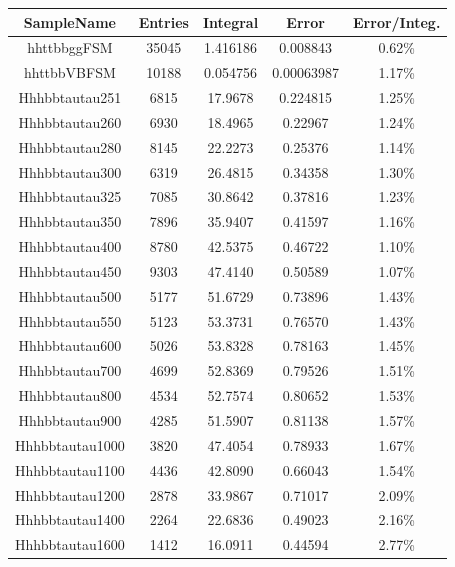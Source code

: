 \begin{table}
    \centering
    \scriptsize
    \begin{tabular}{|c|c|c|c|c|}
	
	\hline
	\hline
	SampleName & Entries & Integral & Error & Error/Integ.\\
	
	\hline
	\hline
	hhttbbggFSM    &35045	 &1.416186  &	0.008843 & 0.62\%\\	
	hhttbbVBFSM	   &10188  	&0.054756 	&0.00063987&1.17\% \\
  	Hhhbbtautau251 & 6815	 & 17.9678  & 0.224815 & 1.25\% \\
  	Hhhbbtautau260 & 6930	 & 18.4965  & 0.22967   & 1.24\% \\
	Hhhbbtautau280 & 8145	 & 22.2273  & 0.25376   & 1.14\% \\
	Hhhbbtautau300 & 6319 	& 26.4815  & 0.34358   & 	1.30\% \\
 	Hhhbbtautau325 & 7085 	& 30.8642  & 0.37816   & 	1.23\% \\
  	Hhhbbtautau350 & 7896 	& 35.9407  & 0.41597   & 	1.16\% \\
  	Hhhbbtautau400 & 8780 	& 42.5375  & 0.46722   & 	1.10\% \\
        Hhhbbtautau450  & 9303 	& 47.4140  & 0.50589  &  	1.07\% \\
	Hhhbbtautau500  & 5177 	& 51.6729  & 0.73896  & 	1.43\% \\
	Hhhbbtautau550  & 5123 	& 53.3731  & 0.76570  & 	1.43\% \\
	Hhhbbtautau600   & 5026 	& 53.8328 & 0.78163  & 	1.45\% \\
	Hhhbbtautau700   &	4699	 & 52.8369 & 0.79526 & 	1.51\% \\
	Hhhbbtautau800   &	4534	 & 52.7574 & 0.80652 & 	1.53\% \\
	Hhhbbtautau900   &	4285	 & 51.5907 & 0.81138 & 	1.57\% \\
	Hhhbbtautau1000 &	3820	 & 47.4054 & 0.78933 & 	1.67\% \\
	Hhhbbtautau1100 &	4436	 & 42.8090 & 0.66043 & 	1.54\% \\
 	Hhhbbtautau1200 &	2878	 & 33.9867 & 0.71017 & 	2.09\% \\	
	Hhhbbtautau1400 &	2264	 & 22.6836 & 0.49023 & 	2.16\% \\
 	Hhhbbtautau1600 &	1412	 & 16.0911 & 0.44594 & 	2.77\% \\
  	\hline
  

\end{tabular}
\end{table}
